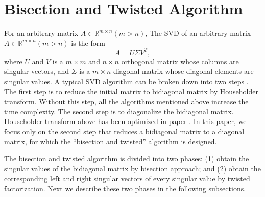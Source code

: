 \section{Bisection and Twisted Algorithm} \label{sec:algorithm}
For an arbitrary matrix $A\in \mathbb{R}^{m \times n} (m>n)$,
The SVD of an arbitrary matrix $A\in \mathbb{R}^{m \times n} (m>n)$ is the form 
\[A = U \Sigma V^T,\] where $U$ and $V$ is a $m \times m$ and $n \times n$ orthogonal matrix whose columns are singular vectors, and $\Sigma$ is a $m\times n$ diagonal matrix whose diagonal elements are singular values.
A typical SVD algorithm can be broken down into two steps \cite{65SIAM}.
The first step is to reduce the initial matrix to bidiagonal matrix by Householder transform. Without this step, all the algorithms mentioned above increase the time complexity.
The second step is to diagonalize the bidiagonal matrix.
Householder transform above has been optimized in paper \cite{LiuHouseholder}.
In this paper, we focus only on the second step that reduces a bidiagonal matrix to a diagonal matrix, for which the ``bisection and twisted'' algorithm is designed.
 
The bisection and twisted algorithm is divided into two phases:
(1) obtain the singular values of the bidiagonal matrix by bisection approach; and
(2) obtain the corresponding left and right singular vectors of every singular value by twisted factorization.
Next we describe these two phases in the following subsections.

